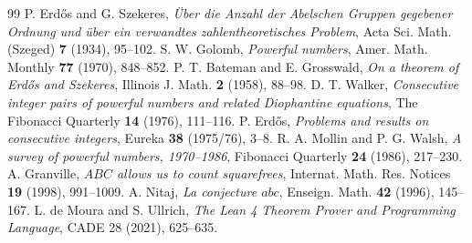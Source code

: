 \documentclass[11pt,a4paper]{article}
\theoremstyle{definition}
\begin{document}
\begin{thebibliography}{99}
 P. Erd\H{o}s and G. Szekeres, \textit{\"{U}ber die Anzahl der Abelschen Gruppen gegebener Ordnung und \"uber ein verwandtes zahlentheoretisches Problem}, Acta Sci. Math. (Szeged) \textbf{7} (1934), 95--102.
 S. W. Golomb, \textit{Powerful numbers}, Amer. Math. Monthly \textbf{77} (1970), 848--852.
 P. T. Bateman and E. Grosswald, \textit{On a theorem of Erd\H{o}s and Szekeres}, Illinois J. Math. \textbf{2} (1958), 88--98.
 D. T. Walker, \textit{Consecutive integer pairs of powerful numbers and related Diophantine equations}, The Fibonacci Quarterly \textbf{14} (1976), 111--116.
 P. Erd\H{o}s, \textit{Problems and results on consecutive integers}, Eureka \textbf{38} (1975/76), 3--8.
 R. A. Mollin and P. G. Walsh, \textit{A survey of powerful numbers, 1970--1986}, Fibonacci Quarterly \textbf{24} (1986), 217--230.
 A. Granville, \textit{$ABC$ allows us to count squarefrees}, Internat. Math. Res. Notices \textbf{19} (1998), 991--1009.
 A. Nitaj, \textit{La conjecture $abc$}, Enseign. Math. \textbf{42} (1996), 145--167.
 L. de Moura and S. Ullrich, \textit{The Lean 4 Theorem Prover and Programming Language}, CADE 28 (2021), 625--635.
\end{thebibliography}
\end{document}
